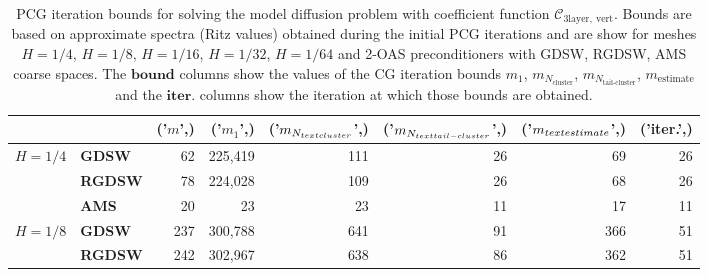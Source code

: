 \begin{table}[H]
\centering
\caption{PCG iteration bounds for solving the model diffusion problem with coefficient function $\mathcal{C}_{\mathrm{3layer, \ vert}}$. Bounds are based on approximate spectra (Ritz values) obtained during the initial PCG iterations and are show for meshes $H=1/4$, $H=1/8$, $H=1/16$, $H=1/32$, $H=1/64$ and 2-OAS preconditioners with GDSW, RGDSW, AMS coarse spaces. The $\textbf{bound}$ columns show the values of the CG iteration bounds $m_1$, $m_{N_{\text{cluster}}}$, $m_{N_{\text{tail-cluster}}}$, $m_{\text{estimate}}$ and the $\textbf{iter.}$ columns show the iteration at which those bounds are obtained.}
\label{tab:cg_iteration_bound_coef=3lvert}
\begin{tabular}{llrrrrrr}
\toprule
 &  & ('$m$',) & ('$m_1$',) & ('$m_{N_{\\text{cluster}}}$',) & ('$m_{N_{\\text{tail-cluster}}}$',) & ('$m_{\\text{estimate}}$',) & ('iter.',) \\
\midrule
\multirow[c]{3}{*}{\bfseries $H=1/4$} & \bfseries GDSW & 62 & {\cellcolor[HTML]{E2E4FB}} \color[HTML]{000000} 225,419 & {\cellcolor[HTML]{ACB8F4}} \color[HTML]{000000} 111 & {\cellcolor[HTML]{768BEC}} \color[HTML]{F1F1F1} 26 & {\cellcolor[HTML]{405FE5}} \color[HTML]{F1F1F1} 69 & 26 \\
\cline{2-8}
\bfseries  & \bfseries RGDSW & 78 & {\cellcolor[HTML]{E2E4FB}} \color[HTML]{000000} 224,028 & {\cellcolor[HTML]{768BEC}} \color[HTML]{F1F1F1} 109 & {\cellcolor[HTML]{ACB8F4}} \color[HTML]{000000} 26 & {\cellcolor[HTML]{405FE5}} \color[HTML]{F1F1F1} 68 & 26 \\
\cline{2-8}
\bfseries  & \bfseries AMS & 20 & {\cellcolor[HTML]{405FE5}} \color[HTML]{F1F1F1} 23 & {\cellcolor[HTML]{405FE5}} \color[HTML]{F1F1F1} 23 & {\cellcolor[HTML]{E2E4FB}} \color[HTML]{000000} 11 & {\cellcolor[HTML]{405FE5}} \color[HTML]{F1F1F1} 17 & 11 \\
\cline{1-8} \cline{2-8}
\multirow[c]{3}{*}{\bfseries $H=1/8$} & \bfseries GDSW & 237 & {\cellcolor[HTML]{E2E4FB}} \color[HTML]{000000} 300,788 & {\cellcolor[HTML]{ACB8F4}} \color[HTML]{000000} 641 & {\cellcolor[HTML]{768BEC}} \color[HTML]{F1F1F1} 91 & {\cellcolor[HTML]{405FE5}} \color[HTML]{F1F1F1} 366 & 51 \\
\cline{2-8}
\bfseries  & \bfseries RGDSW & 242 & {\cellcolor[HTML]{E2E4FB}} \color[HTML]{000000} 302,967 & {\cellcolor[HTML]{ACB8F4}} \color[HTML]{000000} 638 & {\cellcolor[HTML]{768BEC}} \color[HTML]{F1F1F1} 86 & {\cellcolor[HTML]{405FE5}} \color[HTML]{F1F1F1} 362 & 51 \\

\end{tabular}
\end{table}

